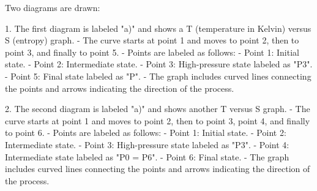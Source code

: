Two diagrams are drawn:  

1. The first diagram is labeled "a)" and shows a T (temperature in Kelvin) versus S (entropy) graph.  
   - The curve starts at point 1 and moves to point 2, then to point 3, and finally to point 5.  
   - Points are labeled as follows:  
     - Point 1: Initial state.  
     - Point 2: Intermediate state.  
     - Point 3: High-pressure state labeled as "P3".  
     - Point 5: Final state labeled as "P".  
   - The graph includes curved lines connecting the points and arrows indicating the direction of the process.  

2. The second diagram is labeled "a)" and shows another T versus S graph.  
   - The curve starts at point 1 and moves to point 2, then to point 3, point 4, and finally to point 6.  
   - Points are labeled as follows:  
     - Point 1: Initial state.  
     - Point 2: Intermediate state.  
     - Point 3: High-pressure state labeled as "P3".  
     - Point 4: Intermediate state labeled as "P0 = P6".  
     - Point 6: Final state.  
   - The graph includes curved lines connecting the points and arrows indicating the direction of the process.